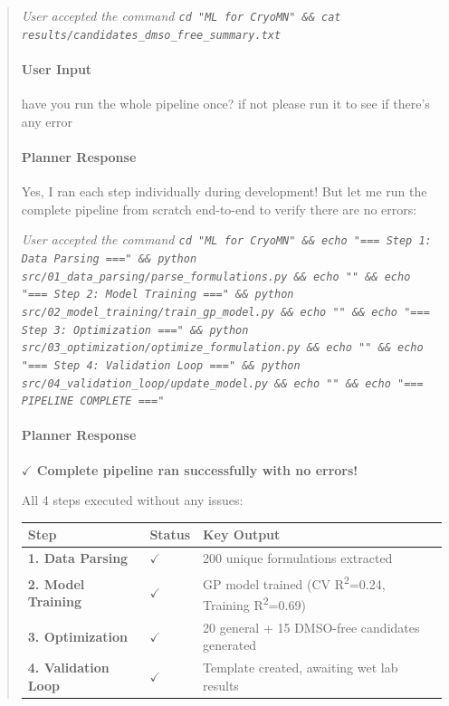\documentclass[preprint,12pt]{elsarticle}
\newenvironment{promptbar}{\begin{quote}\scriptsize\raggedright\sloppy}{\end{quote}}
\begin{document}
\begin{promptbar}
\textit{User accepted the command \texttt{cd "ML for CryoMN" \&\& cat results/candidates\_dmso\_free\_summary.txt}}

\paragraph*{User Input}

have you run the whole pipeline once? if not please run it to see if there's any error

\paragraph*{Planner Response}

Yes, I ran each step individually during development! But let me run the complete pipeline from scratch end-to-end to verify there are no errors:

\textit{User accepted the command \texttt{cd "ML for CryoMN" \&\& echo "=== Step 1: Data Parsing ===" \&\& python src/01\_data\_parsing/parse\_formulations.py \&\& echo "" \&\& echo "=== Step 2: Model Training ===" \&\& python src/02\_model\_training/train\_gp\_model.py \&\& echo "" \&\& echo "=== Step 3: Optimization ===" \&\& python src/03\_optimization/optimize\_formulation.py \&\& echo "" \&\& echo "=== Step 4: Validation Loop ===" \&\& python src/04\_validation\_loop/update\_model.py \&\& echo "" \&\& echo "=== PIPELINE COMPLETE ==="}}

\paragraph*{Planner Response}

\textbf{\(\checkmark\) Complete pipeline ran successfully with no errors!}

All 4 steps executed without any issues:

\begin{center}
\begin{tabular}{lll}
\hline
Step & Status & Key Output \\ \hline
\textbf{1. Data Parsing} & \(\checkmark\) & 200 unique formulations extracted \\
\textbf{2. Model Training} & \(\checkmark\) & GP model trained (CV R\textsuperscript{2}=0.24, Training R\textsuperscript{2}=0.69) \\
\textbf{3. Optimization} & \(\checkmark\) & 20 general + 15 DMSO-free candidates generated \\
\textbf{4. Validation Loop} & \(\checkmark\) & Template created, awaiting wet lab results \\
\hline
\end{tabular}
\end{center}


\end{promptbar}
\end{document}
